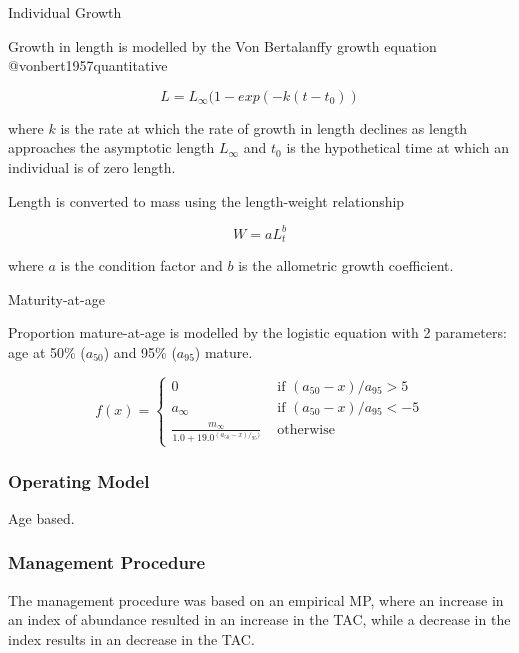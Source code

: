 \documentclass[preprint,12pt]{elsarticle}
\begin{document}
Individual Growth

Growth in length is modelled by the Von Bertalanffy growth equation @vonbert1957quantitative

\begin{equation} L = L_\infty(1 - exp(-k(t-t_0)) \end{equation}
         
where $k$ is the rate at which the rate of growth in length declines as length approaches the asymptotic length  $L_\infty$ and $t_{0}$ is the hypothetical time at which an individual is of zero length.

Length is converted to mass using the length-weight relationship 
    
\begin{equation} W = aL_t^b \end{equation}

\noindent where $a$ is the condition factor and $b$ is the allometric growth coefficient.


Maturity-at-age

Proportion mature-at-age is modelled by the logistic equation with 2 parameters: age at 50\% ($a_{50}$) and 95\% ($a_{95}$) mature.

\begin{equation}
f(x) = \left\{ \begin{array}{ll}
			0                                 &\mbox{ if $(a_{50}-x)/a_{95} >  5$} \\
			a_{\infty}                        &\mbox{ if $(a_{50}-x)/a_{95} < -5$} \\
			\frac{m_{\infty}}{1.0+19.0^{(a_{50}-x)/_{95})}} &\mbox{ otherwise}
		\end{array}
       \right.
\end{equation}


\subsubsection{Operating Model}

Age based.

\subsubsection{Management Procedure}

The management procedure was based on an empirical MP, where an increase in an index of abundance resulted in an increase in the TAC, while a decrease in the index results in an decrease in the TAC.
\end{document}
